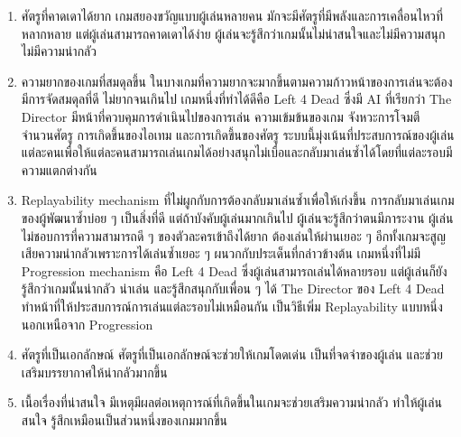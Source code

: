 \begin{enumerate}
  \item ศัตรูที่คาดเดาได้ยาก เกมสยองขวัญแบบผู้เล่นหลายคน มักจะมีศัตรูที่มีพลังและการเคลื่อนไหวที่หลากหลาย แต่ผู้เล่นสามารถคาดเดาได้ง่าย ผู้เล่นจะรู้สึกว่าเกมนั้นไม่น่าสนใจและไม่มีความสนุก ไม่มีความน่ากลัว
  \item ความยากของเกมที่สมดุลขึ้น ในบางเกมที่ความยากจะมากขึ้นตามความก้าวหน้าของการเล่นจะต้องมีการจัดสมดุลที่ดี ไม่ยากจนเกินไป เกมหนึ่งที่ทำได้ดีคือ Left 4 Dead ซึ่งมี AI ที่เรียกว่า The Director มีหน้าที่ควบคุมการดำเนินไปของการเล่น ความเข้มข้นของเกม จังหวะการโจมตี จำนวนศัตรู การเกิดขึ้นของไอเทม และการเกิดขึ้นของศัตรู ระบบนี้มุ่งเน้นที่ประสบการณ์ของผู้เล่นแต่ละคนเพื่อให้แต่ละคนสามารถเล่นเกมได้อย่างสนุกไม่เบื่อและกลับมาเล่นซ้ำได้โดยที่แต่ละรอบมีความแตกต่างกัน \cite{DirectorL4D}
  \item Replayability mechanism ที่ไม่ผูกกับการต้องกลับมาเล่นซ้ำเพื่อให้เก่งขึ้น การกลับมาเล่นเกมของผู้พัฒนาซ้ำบ่อย ๆ เป็นสิ่งที่ดี แต่ถ้าบังคับผู้เล่นมากเกินไป ผู้เล่นจะรู้สึกว่าตนมีภาระงาน ผู้เล่นไม่ชอบการที่ความสามารถดี ๆ ของตัวละครเข้าถึงได้ยาก ต้องเล่นให้ผ่านเยอะ ๆ อีกทั้งเกมจะสูญเสียความน่ากลัวเพราะการได้เล่นซ้ำเยอะ ๆ ผนวกกับประเด็นที่กล่าวข้างต้น เกมหนึ่งที่ไม่มี Progression mechanism คือ Left 4 Dead \cite{IconicL4D} ซึ่งผู้เล่นสามารถเล่นได้หลายรอบ แต่ผู้เล่นก็ยังรู้สึกว่าเกมนั้นน่ากลัว น่าเล่น และรู้สึกสนุกกับเพื่อน ๆ ได้ The Director ของ Left 4 Dead ทำหน้าที่ให้ประสบการณ์การเล่นแต่ละรอบไม่เหมือนกัน เป็นวิธีเพิ่ม Replayability แบบหนึ่งนอกเหนือจาก Progression
  \item ศัตรูที่เป็นเอกลักษณ์ ศัตรูที่เป็นเอกลักษณ์จะช่วยให้เกมโดดเด่น เป็นที่จดจำของผู้เล่น และช่วยเสริมบรรยากาศให้น่ากลัวมากขึ้น
  \item เนื้อเรื่องที่น่าสนใจ มีเหตุมีผลต่อเหตุการณ์ที่เกิดขึ้นในเกมจะช่วยเสริมความน่ากลัว ทำให้ผู้เล่นสนใจ รู้สึกเหมือนเป็นส่วนหนึ่งของเกมมากขึ้น
\end{enumerate}



